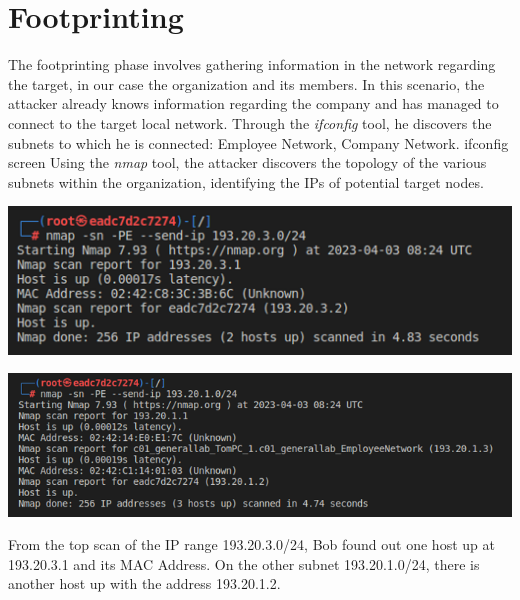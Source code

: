 \documentclass[a4paper, 12pt, oneside]{extbook}
\begin{document}
\chapter{Footprinting}
The footprinting phase involves gathering information in the network regarding the target, in our case the organization and its members.
\newline In this scenario, the attacker already knows information regarding the company and has managed to connect to the target local network.
\newline Through the \textit{ifconfig} tool, he discovers the subnets to which he is connected: Employee Network, Company Network.
\newline ifconfig screen
\newline Using the \textit{nmap} tool, the attacker discovers the topology of the various subnets within the organization, identifying the IPs of potential target nodes.
\begin{center}
\includegraphics[scale=1]{../Image/footprinting_company_network.png}
\end{center}
\begin{center}
\includegraphics[scale=0.76]{../Image/footprinting_employee_network.png}
\end{center}
From the top scan of the IP range 193.20.3.0/24, Bob found out one host up at 193.20.3.1 and its MAC Address. On the other subnet 193.20.1.0/24, there is another host up with the address 193.20.1.2.
\end{document}
